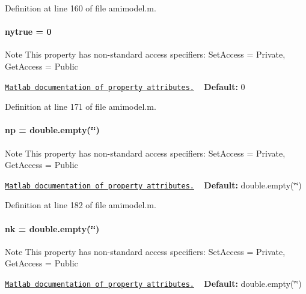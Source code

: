 Definition at line 160 of file amimodel.\+m.

\hypertarget{classamimodel_ac91d7b36031ec122abc9f739692b02e8}{}
\paragraph[{nytrue}]{\setlength{\rightskip}{0pt plus 5cm}nytrue = 0}\label{classamimodel_ac91d7b36031ec122abc9f739692b02e8}
\begin{DoxyNote}{Note}
This property has non-\/standard access specifiers\+: {\ttfamily Set\+Access = Private, Get\+Access = Public} 

\href{http://www.mathworks.com/help/matlab/matlab_oop/property-attributes.html}{\tt Matlab documentation of property attributes.} ~\newline
{\bfseries Default\+:} 0 
\end{DoxyNote}


Definition at line 171 of file amimodel.\+m.

\hypertarget{classamimodel_a6f6e2fe71b05c4c2f2d967ce9ca02dfd}{}
\paragraph[{np}]{\setlength{\rightskip}{0pt plus 5cm}np = double.\+empty(\char`\"{}\char`\"{})}\label{classamimodel_a6f6e2fe71b05c4c2f2d967ce9ca02dfd}
\begin{DoxyNote}{Note}
This property has non-\/standard access specifiers\+: {\ttfamily Set\+Access = Private, Get\+Access = Public} 

\href{http://www.mathworks.com/help/matlab/matlab_oop/property-attributes.html}{\tt Matlab documentation of property attributes.} ~\newline
{\bfseries Default\+:} double.\+empty(\char`\"{}\char`\"{}) 
\end{DoxyNote}


Definition at line 182 of file amimodel.\+m.

\hypertarget{classamimodel_afd6bea572754e0c3c320664bdccf0200}{}
\paragraph[{nk}]{\setlength{\rightskip}{0pt plus 5cm}nk = double.\+empty(\char`\"{}\char`\"{})}\label{classamimodel_afd6bea572754e0c3c320664bdccf0200}
\begin{DoxyNote}{Note}
This property has non-\/standard access specifiers\+: {\ttfamily Set\+Access = Private, Get\+Access = Public} 

\href{http://www.mathworks.com/help/matlab/matlab_oop/property-attributes.html}{\tt Matlab documentation of property attributes.} ~\newline
{\bfseries Default\+:} double.\+empty(\char`\"{}\char`\"{}) 
\end{DoxyNote}


